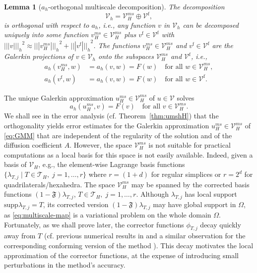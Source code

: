 \documentclass[10pt]{article}
\numberwithin{equation}{section}
\theoremstyle{plain}
\newtheorem{lemma}[theorem]{Lemma}
\theoremstyle{definition}
\theoremstyle{remark}
\begin{document}
\begin{lemma}[$a_h$-orthogonal multiscale decomposition]\label{l:odh1}
The decomposition
$$ {\mathcal{V}_h}={\mathcal{V}^{ms}_{H}}\oplus {\mathcal{V}^{\operatorname*{f}}}, $$
is orthogonal with respect to $a_h$, i.e., any function $v$ in ${\mathcal{V}_h}$ can be
decomposed uniquely into some function $v^{ms}_H\in {\mathcal{V}^{ms}_{H}}$ plus $v^{\operatorname*{f}}\in {\mathcal{V}^{\operatorname*{f}}}$ with ${||| {v} |||_h}^2\approx{||| {v^{ms}_H} |||_h}^2+{||| {v^{\operatorname*{f}}} |||_h}^2$.
The functions $v^{ms}_H\in {\mathcal{V}^{ms}_{H}}$ and $v^{\operatorname*{f}}\in {\mathcal{V}^{\operatorname*{f}}}$ are the Galerkin projections of $v\in {\mathcal{V}}_h$ onto the subspaces ${\mathcal{V}^{ms}_{H}}$ and ${\mathcal{V}^{\operatorname*{f}}}$, i.e.,
\begin{align*}
 a_h(v^{ms}_H,w)&=a_h(v,w)=F(w)\quad \text{for all }w\in{\mathcal{V}^{ms}_{H}},\\
 a_h(v^{\operatorname*{f}},w)&=a_h(v,w)=F(w)\quad \text{for all }w\in{\mathcal{V}^{\operatorname*{f}}}.
\end{align*}
\end{lemma}
The unique Galerkin approximation ${u^{ms}_{H}}\in {\mathcal{V}^{ms}_{H}}$ of $u\in {\mathcal{V}}$ solves
\begin{equation}\label{eq:GMM}
  {a_h({u^{ms}_{H}},{v})} = F(v)\quad \text{for all }v\in{\mathcal{V}^{ms}_{H}}.
\end{equation}
We shall see in the error analysis (cf. Theorem~\ref{thm:umshH}) that the orthogonality yields error estimates for the Galerkin approximation ${u^{ms}_{H}}\in {\mathcal{V}^{ms}_{H}}$ of \eqref{eq:GMM} that are independent of the regularity of the solution and of the diffusion coefficient $A$. 
However, the space ${\mathcal{V}^{ms}_{H}}$ is not suitable for practical computations as a local basis for this space is not easily available. 
Indeed, given a basis of ${\mathcal{V}_H}$, e.g., the element-wise Lagrange basis functions $\{\lambda_{T,j}\;|\;T\in{\mathcal{T}}_H,\;j=1,\ldots,r\}$ where $r=(1+d)$ for regular simplices or $r=2^d$ for quadrilaterals/hexahedra.
 The space ${\mathcal{V}^{ms}_{H}}$ may be spanned by the
corrected basis functions $(1-{\mathfrak{F}})\lambda_{T,j}$, $T\in{\mathcal{T}}_H,\;j=1,\ldots,r$. 
Although $\lambda_{T,j}$ has local support ${\text{supp}}{\lambda_{T,j}}=T$, its corrected version $(1-{\mathfrak{F}})\lambda_{T,j}$ may have global support in $\Omega$, as \eqref{eq:multiscale-map} is a variational problem on the whole domain $\Omega$. Fortunately, as we shall prove later, the corrector functions $\phi_{T,j}$ decay quickly away from $T$ (cf. previous numerical results in \cite{EGM12} and a similar observation for the corresponding conforming version of the method \cite{MP11}). This decay motivates the local approximation of the corrector functions, at the expense of introducing small perturbations in the method's accuracy. 
\end{document}

